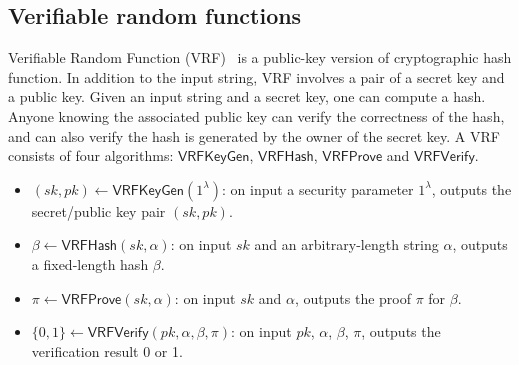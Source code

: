 \documentclass[a0,portrait]{a0poster}
\begin{document}
\begin{multicols}{2}
    \color{DarkSlateGray} %

    \section*{Verifiable random functions}
    Verifiable Random Function (VRF)~\cite{micali1999verifiable} is a public-key version of cryptographic hash function.
    In addition to the input string, VRF involves a pair of a secret key and a public key.
    Given an input string and a secret key, one can compute a hash.
    Anyone knowing the associated public key can verify the correctness of the hash, and can also verify the hash is generated by the owner of the secret key.
    A VRF consists of four algorithms: $\mathsf{VRFKeyGen}$, $\mathsf{VRFHash}$, $\mathsf{VRFProve}$ and $\mathsf{VRFVerify}$.

    \begin{itemize}
        \item $(sk, pk) \gets \mathsf{VRFKeyGen}(1^{\lambda})$: on input a security parameter $1^{\lambda}$, outputs the secret/public key pair $(sk, pk)$.
        \item $\beta \gets \mathsf{VRFHash}(sk, \alpha)$: on input $sk$ and an arbitrary-length string $\alpha$, outputs a fixed-length hash $\beta$.
        \item $\pi \gets \mathsf{VRFProve}(sk, \alpha)$: on input $sk$ and $\alpha$, outputs the proof $\pi$ for $\beta$.
        \item $\{0, 1\} \gets \mathsf{VRFVerify}(pk, \alpha, \beta, \pi)$: on input $pk$, $\alpha$, $\beta$, $\pi$, outputs the verification result 0 or 1.
    \end{itemize}






\end{multicols}
\end{document}
